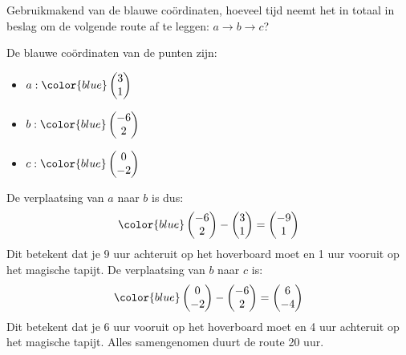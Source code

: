 \documentclass{ximera}
\begin{document}
\begin{exercise}
    Gebruikmakend van de blauwe coördinaten, hoeveel tijd neemt het in totaal in beslag om de volgende route af te leggen: \(a \rightarrow b \rightarrow c\)?
    \begin{oplossing}
        De blauwe coördinaten van de punten zijn:
        \begin{itemize}
            \item \(a: \color{blue}\begin{pmatrix} 3 \\ 1 \end{pmatrix}\)
            \item \(b: \color{blue}\begin{pmatrix} -6 \\ 2 \end{pmatrix}\)
            \item \(c: \color{blue}\begin{pmatrix} 0 \\ -2 \end{pmatrix}\)
        \end{itemize}
        De verplaatsing van \(a\) naar \(b\) is dus:
        \[\color{blue}\begin{pmatrix} -6 \\ 2 \end{pmatrix} - \begin{pmatrix} 3 \\ 1 \end{pmatrix} = \begin{pmatrix} -9 \\ 1 \end{pmatrix}\]
        Dit betekent dat je 9 uur achteruit op het hoverboard moet en 1 uur vooruit op het magische tapijt.
        De verplaatsing van \(b\) naar \(c\) is:
        \[\color{blue}\begin{pmatrix} 0 \\ -2 \end{pmatrix} - \begin{pmatrix} -6 \\ 2 \end{pmatrix} = \begin{pmatrix} 6 \\ -4 \end{pmatrix}\]
        Dit betekent dat je 6 uur vooruit op het hoverboard moet en 4 uur achteruit op het magische tapijt.
        Alles samengenomen duurt de route 20 uur.
    \end{oplossing}
\end{exercise}
\end{document}
